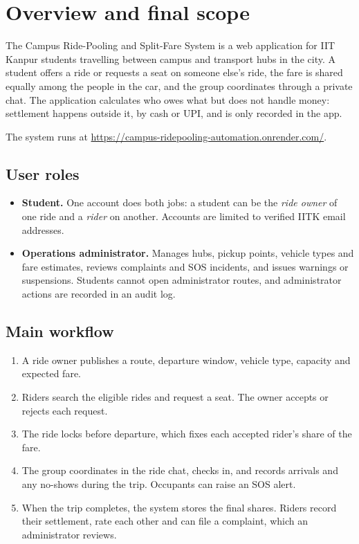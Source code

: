 \section{Overview and final scope}

The Campus Ride-Pooling and Split-Fare System is a web application for IIT Kanpur students travelling
between campus and transport hubs in the city. A student offers a ride or requests a seat on someone
else's ride, the fare is shared equally among the people in the car, and the group coordinates through
a private chat. The application calculates who owes what but does not handle money: settlement happens
outside it, by cash or UPI, and is only recorded in the app.

The system runs at \url{https://campus-ridepooling-automation.onrender.com/}.

\subsection{User roles}
\begin{itemize}
  \item \textbf{Student.} One account does both jobs: a student can be the \emph{ride owner} of one
    ride and a \emph{rider} on another. Accounts are limited to verified IITK email addresses.
  \item \textbf{Operations administrator.} Manages hubs, pickup points, vehicle types and fare
    estimates, reviews complaints and SOS incidents, and issues warnings or suspensions. Students cannot
    open administrator routes, and administrator actions are recorded in an audit log.
\end{itemize}

\subsection{Main workflow}
\begin{enumerate}
  \item A ride owner publishes a route, departure window, vehicle type, capacity and expected fare.
  \item Riders search the eligible rides and request a seat. The owner accepts or rejects each request.
  \item The ride locks before departure, which fixes each accepted rider's share of the fare.
  \item The group coordinates in the ride chat, checks in, and records arrivals and any no-shows during
    the trip. Occupants can raise an SOS alert.
  \item When the trip completes, the system stores the final shares. Riders record their settlement,
    rate each other and can file a complaint, which an administrator reviews.
\end{enumerate}

